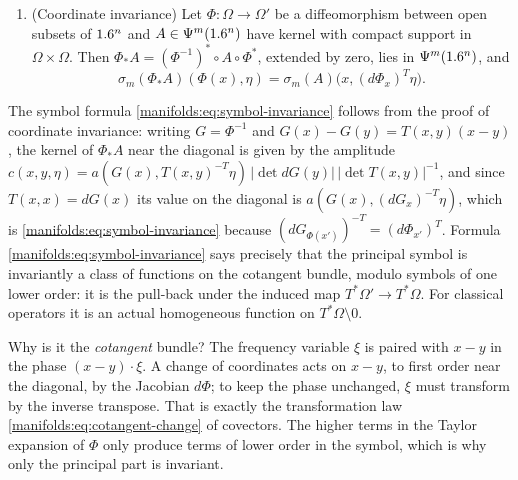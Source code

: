 \begin{enumerate}[label=(E\arabic*),leftmargin=3em]
$\Hs s(\R^n)\to\Hs{s-m}(\R^n)$ for every $s\in\R$; in particular $\Psido0(\R^n)$
acts boundedly on $L^2(\R^n)$, and multiplication by $\phi\in\CIb(\R^n)$ is bounded on
every $\Hs s(\R^n)$.
\item\label{manifolds:E7} (Coordinate invariance) Let $\Phi:\Omega\to\Omega'$ be a
diffeomorphism between open subsets of $1.6^n$ and $A\in\Psi^{m}(1.6^n)$ have kernel
with compact support in $\Omega\times\Omega$. Then
$\Phi_*A=(\Phi^{-1})^*\circ A\circ\Phi^*$, extended by zero, lies in
$\Psi^{m}(1.6^n)$, and
\begin{equation}\label{manifolds:eq:symbol-invariance}
\sigma_m(\Phi_*A)(\Phi(x),\eta)=\sigma_m(A)\big(x,(d\Phi_x)^T\eta\big).
\end{equation}
\end{enumerate}
The symbol formula \eqref{manifolds:eq:symbol-invariance} follows from the
proof of coordinate invariance: writing $G=\Phi^{-1}$ and
$G(x)-G(y)=T(x,y)(x-y)$, the kernel of $\Phi_*A$ near the diagonal is given by the
amplitude $c(x,y,\eta)=a(G(x),T(x,y)^{-T}\eta)\,|\det dG(y)|\,|\det T(x,y)|^{-1}$, and
since $T(x,x)=dG(x)$ its value on the diagonal is $a(G(x),(dG_x)^{-T}\eta)$, which
is \eqref{manifolds:eq:symbol-invariance} because $(dG_{\Phi(x')})^{-T}=(d\Phi_{x'})^T$.
Formula \eqref{manifolds:eq:symbol-invariance} says precisely that the principal
symbol is invariantly a class of functions on the cotangent bundle, modulo symbols
of one lower order: it is the pull-back under the induced map $T^*\Omega'\to T^*\Omega$.
For classical operators it is an actual homogeneous function on
$T^*\Omega\setminus0$.

\begin{discussion}
Why is it the \emph{cotangent} bundle? The frequency variable $\xi$ is paired
with $x-y$ in the phase $(x-y)\cdot\xi$. A change of coordinates acts on
$x-y$, to first order near the diagonal, by the Jacobian $d\Phi$; to keep the
phase unchanged, $\xi$ must transform by the inverse transpose. That is
exactly the transformation law \eqref{manifolds:eq:cotangent-change} of
covectors. The higher terms in the Taylor expansion of $\Phi$ only produce
terms of lower order in the symbol, which is why only the principal part is
invariant.
\end{discussion}


